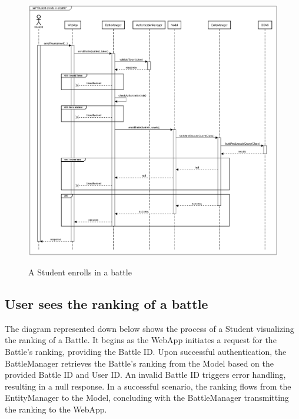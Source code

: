 \documentclass{Configuration_Files/Template}
\begin{document}
\begin{figure}[H]
\centering
\includegraphics[scale = 0.33]{Images/diagrams/sequences/enrollBattle.png}\\
\caption{A Student enrolls in a battle}
\end{figure}

\subsection*{User sees the ranking of a battle}

The diagram represented down below shows the process of a Student visualizing the ranking of a Battle. It begins as the WebApp initiates a request for the Battle's ranking, providing the Battle ID. Upon successful authentication, the BattleManager retrieves the Battle's ranking from the Model based on the provided Battle ID and User ID. An invalid Battle ID triggers error handling, resulting in a null response. In a successful scenario, the ranking flows from the EntityManager to the Model, concluding with the BattleManager transmitting the ranking to the WebApp.
\end{document}
